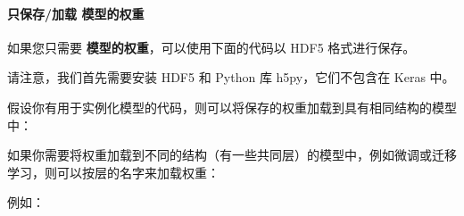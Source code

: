 \paragraph{只保存/加载
模型的权重}\label{ux53eaux4fddux5b58ux52a0ux8f7d-ux6a21ux578bux7684ux6743ux91cd}

如果您只需要 \textbf{模型的权重}，可以使用下面的代码以 HDF5
格式进行保存。

请注意，我们首先需要安装 HDF5 和 Python 库 h5py，它们不包含在 Keras 中。

\begin{Shaded}
\begin{Highlighting}[]
\NormalTok{)}
\end{Highlighting}
\end{Shaded}

假设你有用于实例化模型的代码，则可以将保存的权重加载到具有相同结构的模型中：

\begin{Shaded}
\begin{Highlighting}[]
\NormalTok{)}
\end{Highlighting}
\end{Shaded}

如果你需要将权重加载到不同的结构（有一些共同层）的模型中，例如微调或迁移学习，则可以按层的名字来加载权重：

\begin{Shaded}
\begin{Highlighting}[]
\OperatorTok{=}\NormalTok{)}
\end{Highlighting}
\end{Shaded}

例如：

\begin{Shaded}
\begin{Highlighting}[]

\OperatorTok{=} 
\OperatorTok{=}\OperatorTok{=}\NormalTok{))  }
\OperatorTok{=}\NormalTok{))  }

\OperatorTok{=}\NormalTok{)}
\end{Highlighting}
\end{Shaded}

